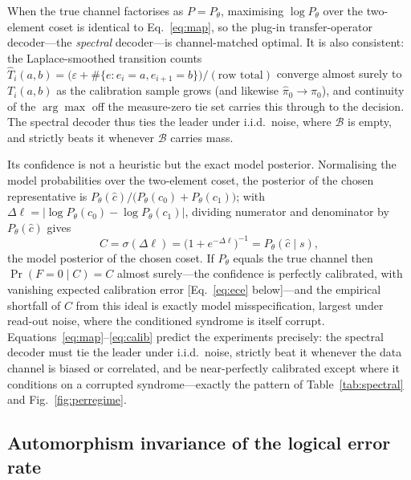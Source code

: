\documentclass[reprint,aps,prxquantum,amsmath,amssymb,floatfix,nofootinbib,longbibliography]{revtex4-2}
\theoremstyle{definition}
\theoremstyle{remark}
\theoremstyle{plain}
\newcommand{\eps}{\varepsilon}
\begin{document}
When the true channel factorises as $P=P_\theta$, maximising $\log P_\theta$ over the two-element coset is identical to Eq.~\eqref{eq:map}, so the plug-in transfer-operator decoder---the \emph{spectral} decoder---is channel-matched optimal. It is also consistent: the Laplace-smoothed transition counts $\hat T_i(a,b)=\bigl(\eps+\#\{e:e_i=a,e_{i+1}=b\}\bigr)/(\text{row total})$ converge almost surely to $T_i(a,b)$ as the calibration sample grows (and likewise $\hat\pi_0\to\pi_0$), and continuity of the $\arg\max$ off the measure-zero tie set carries this through to the decision. The spectral decoder thus ties the leader under i.i.d.\ noise, where $\mathcal B$ is empty, and strictly beats it whenever $\mathcal B$ carries mass.

Its confidence is not a heuristic but the exact model posterior. Normalising the model probabilities over the two-element coset, the posterior of the chosen representative is $P_\theta(\hat c)/\bigl(P_\theta(c_0)+P_\theta(c_1)\bigr)$; with $\Delta\ell=\bigl|\log P_\theta(c_0)-\log P_\theta(c_1)\bigr|$, dividing numerator and denominator by $P_\theta(\hat c)$ gives
\begin{equation}
  C=\sigma(\Delta\ell)=\bigl(1+e^{-\Delta\ell}\bigr)^{-1}=P_\theta(\hat c\mid s),
  \label{eq:calib}
\end{equation}
the model posterior of the chosen coset. If $P_\theta$ equals the true channel then $\Pr(F=0\mid C)=C$ almost surely---the confidence is perfectly calibrated, with vanishing expected calibration error [Eq.~\eqref{eq:ece} below]---and the empirical shortfall of $C$ from this ideal is exactly model misspecification, largest under read-out noise, where the conditioned syndrome is itself corrupt. Equations~\eqref{eq:map}--\eqref{eq:calib} predict the experiments precisely: the spectral decoder must tie the leader under i.i.d.\ noise, strictly beat it whenever the data channel is biased or correlated, and be near-perfectly calibrated except where it conditions on a corrupted syndrome---exactly the pattern of Table~\ref{tab:spectral} and Fig.~\ref{fig:perregime}.

\subsection{Automorphism invariance of the logical error rate}
\label{sec:theory_auto}
\end{document}
